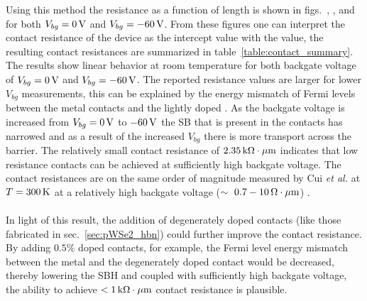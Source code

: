 Using this method the resistance as a function of length is shown in figs.~, , and  for both $V_{bg}=0\,\mathrm{V}$ and $V_{bg}=-60\,\mathrm{V}$. From these figures one can interpret the contact resistance of the device as the intercept value with the value, the resulting contact resistances are summarized in table~\ref{table:contact_summary}. The results show linear behavior at room temperature for both backgate voltage of $V_{bg}=0\,\mathrm{V}$ and $V_{bg}=-60\,\mathrm{V}$. The reported resistance values are larger for lower $V_{bg}$ measurements, this can be explained by the energy mismatch of Fermi levels between the metal contacts and the lightly doped . As the backgate voltage is increased from $V_{bg} = 0\,\mathrm{V}$ to $-60\,\mathrm{V}$ the \acs{SB} that is present in the contacts has narrowed and as a result of the increased $V_{bg}$ there is more transport across the barrier. The relatively small contact resistance of $2.35\,\mathrm{k\Omega\cdot\mu m}$ indicates that low resistance contacts can be achieved at sufficiently high backgate voltage. The contact resistances are on the same order of magnitude measured by Cui \emph{et al.} at $T=300\,\mathrm{K}$ at a relatively high backgate voltage ($\sim~0.7-10\,\mathrm{\Omega\cdot\mu m}$) \cite{Cui_NatureNano2015}.  \\ \\

\noindent In light of this result, the addition of degenerately doped contacts (like those fabricated in sec.~\ref{sec:pWSe2_hbn}) could further improve the contact resistance. By adding $0.5\%$  doped  contacts, for example, the Fermi level energy mismatch between the metal and the degenerately doped  contact would be decreased, thereby lowering the \acs{SBH} and coupled with sufficiently high backgate voltage, the ability to achieve $< 1\,\mathrm{k\Omega\cdot\mu m}$ contact resistance is plausible. \\ \\

